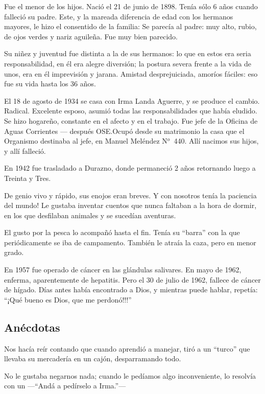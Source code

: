 \documentclass[a4paper]{article}
\begin{document}
Fue el menor de los hijos. Nació el 21 de junio de 1898. Tenía sólo 6 años cuando falleció su padre. Este, y la mareada diferencia de edad con los hermanos mayores, le hizo el consentido de la familia: Se parecía al padre: muy alto, rubio, de ojos verdes y nariz aguileña. Fue muy bien parecido.

Su niñez y juventud fue distinta a la de sus hermanos: lo que en estos era seria responsabilidad, en él era alegre diversión; la postura severa frente a la vida de unos, era en él imprevisión y jarana. Amistad desprejuiciada, amoríos fáciles: eso fue su vida hasta los 36 años.

El 18 de agosto de 1934 se casa con Irma Landa Aguerre, y se produce el cambio. Radical. Excelente esposo, asumió todas las responsabilidades que había eludido. Se hizo hogareño, constante en el afecto y en el trabajo. Fue jefe de la Oficina de Aguas Corrientes --- después OSE.\@ Ocupó desde su matrimonio la casa que el Organismo destinaba al jefe, en Manuel Meléndez N$^o$~440. Allí nacimos sus hijos, y allí falleció.

En 1942 fue trasladado a Durazno, donde permaneció 2 años retornando luego a Treinta y Tres.

De genio vivo y rápido, sus enojos eran breves. Y con nosotros tenía la paciencia del mundo! Le gustaba inventar cuentos que nunca faltaban a la hora de dormir, en los que desfilaban animales y se sucedían aventuras.

El gusto por la pesca lo acompañó hasta el fin. Tenía su ``barra'' con la que periódicamente se iba de campamento. También le atraía la caza, pero en menor grado.

En 1957 fue operado de cáncer en las glándulas salivares. En mayo de 1962, enferma, aparentemente de hepatitis. Pero el 30 de julio de 1962, fallece de cáncer de hígado. Días antes había encontrado a Dios, y mientras puede hablar, repetía: ``¡Qué bueno es Dios, que me perdonó!!!''

\subsection{Anécdotas}

Nos hacía reír contando que cuando aprendió a manejar, tiró a un ``turco'' que llevaba su mercadería en un cajón, desparramando todo.

No le gustaba negarnos nada; cuando le pedíamos algo inconveniente, lo resolvía con un ---``Andá a pedírselo a Irma.''---
\end{document}
